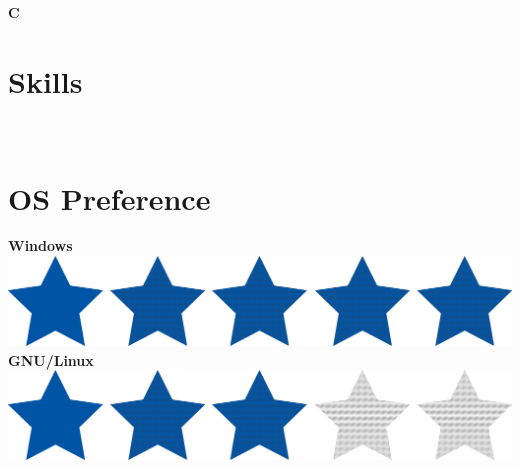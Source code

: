 \documentclass[a4paper]{friggeri-cv}
\begin{document}
\begin{aside}
        \textbf{C}%
        ~
        \section{Skills}\label{sec:skills}
        ~
        \section{OS Preference}\label{sec:os-preference}
        \textbf{Windows}\includegraphics[scale=0.33]{../assets/images/stars/5stars.png}
        \textbf{GNU/Linux}\includegraphics[scale=0.33]{../assets/images/stars/3stars.png}
        ~

\end{aside}
\end{document}

